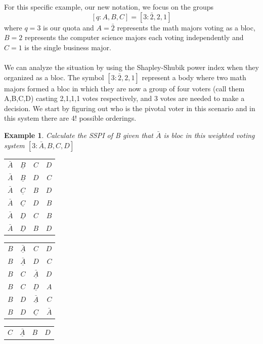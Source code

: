 \documentclass[12pt]{article}
\newtheorem{example}[theorem]{Example}
\begin{document}
For this specific example, our new notation, we focus on the groups $$[q:A,B,C] =[3:\bar{2},2,1]$$ where $q= 3$ is our quota and $A=\bar{2}$ represents the math majors voting as a bloc, $B=2$ represents the computer science majors each voting independently and $C=1$ is the single business major.
\\
\\
We can analyze the situation by using the Shapley-Shubik power index when they organized as a bloc. The symbol $[3:\bar{2},2,1]$ represent a body where two math majors formed a bloc in which they are now a group of four voters (call them A,B,C,D) casting 2,1,1,1 votes respectively, and 3 votes are needed to make a decision. We start by figuring out who is the pivotal voter in this scenario and in this system there are 4! possible orderings.
\begin{example}\label{example1}
Calculate the SSPI of B given that $\bar{A}$ is bloc in this weighted voting system $[3:\bar{A},B,C,D]$  
\begin{center}
\begin{tabular}{ l c c r }
  $\bar{A}$ & $\underline{B}$ & $C$ & $D$\\ 
  $\bar{A}$ & $\underline{B}$ & $D$ & $C$\\
  $\bar{A}$ & $\underline{C}$ & $B$ & $D$\\
  $\bar{A}$ & $\underline{C}$ & $D$ & $B$\\
  $\bar{A}$ & $\underline{D}$ & $C$ & $B$\\
  $\bar{A}$ & $\underline{D}$ & $B$ & $D$\\
\end{tabular}
\end{center}
\begin{center}
\begin{tabular}{ l c c r }
  $B$ & $\underline{\bar{A}}$ & $C$ & $D$\\
  $B$ & $\underline{\bar{A}}$ & $D$ & $C$\\
  $B$ & $C$ & $\underline{\bar{A}}$ & $D$\\
  $B$ & $C$ & $\underline{D}$ & $A$\\
  $B$ & $D$ & $\underline{\bar{A}}$ & $C$\\
  $B$ & $D$ & $\underline{C}$ & $\bar{A}$\\
\end{tabular}
\end{center}
\begin{center}
\begin{tabular}{ l c c r }
  $C$ & $\underline{\bar{A}}$ & $B$ & $D$\\

\end{tabular}
\end{center}
\end{example}
\end{document}

